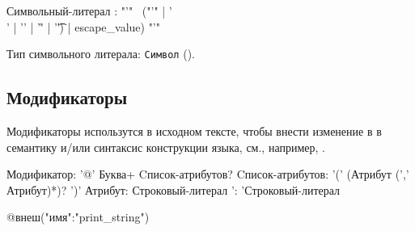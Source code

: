 \begin{Grammar}
Символьный-литерал
    : "'" 
    ~("'" | '\\' | '\n' | '\r' | '\t') | escape_value)
    "'"
\end{Grammar}  

Тип символьного литерала: \verb+Символ+ (). 

\hypertarget{modifiers}{%
\subsection{Модификаторы}\label{lex:modifiers}}

Модификаторы использутся в исходном тексте, чтобы внести изменение в в семантику и/или синтаксис конструкции языка, см., например, .

\begin{Grammar}
Модификатор: '@' Буква+ Cписок-атрибутов?
Cписок-атрибутов: '(' (Атрибут (',' Атрибут)*)? ')'
Атрибут: Строковый-литерал ': 'Строковый-литерал
\end{Grammar}  

\begin{Trivil}
@внеш("имя":"print_string")
\end{Trivil}